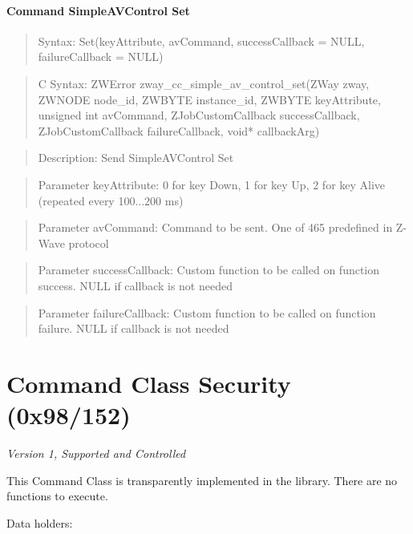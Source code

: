 \paragraph{Command SimpleAVControl Set}
\begin{quote}Syntax: Set(keyAttribute, avCommand, successCallback = NULL, failureCallback = NULL)\end{quote}
\begin{quote}C Syntax: ZWError zway\_cc\_simple\_av\_control\_set(ZWay zway, ZWNODE node\_id, ZWBYTE instance\_id, ZWBYTE keyAttribute, unsigned int avCommand, ZJobCustomCallback successCallback, ZJobCustomCallback failureCallback, void* callbackArg)\end{quote}
\begin{quote}Description: Send SimpleAVControl Set\end{quote}
\begin{quote}Parameter keyAttribute: 0 for key Down, 1 for key Up, 2 for key Alive (repeated every 100...200 ms)\end{quote}
\begin{quote}Parameter avCommand: Command to be sent. One of 465 predefined in Z-Wave protocol\end{quote}
\begin{quote}Parameter successCallback: Custom function to be called on function success. NULL if callback is not needed\end{quote}
\begin{quote}Parameter failureCallback: Custom function to be called on function failure. NULL if callback is not needed\end{quote}



\section{Command Class Security (0x98/152)}

\textit{Version 1, Supported and Controlled}
\newline

This Command Class is transparently implemented in the library. There are no functions to execute.
\newline

\noindent
Data holders:

